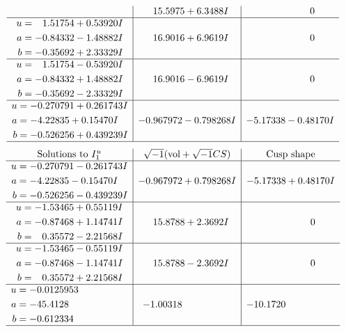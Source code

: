 \documentclass[1p]{elsarticle_modified}
\theoremstyle{definition}
\newcommand{\I}{\sqrt{-1}}
\begin{document}
$$\begin{array}{c|c|c}
 & \phantom{-}15.5975 + 6.3488 I & \phantom{-0.000000 } 0 \\ \hline\begin{aligned}
u &= \phantom{-}1.51754 + 0.53920 I \\
a &= -0.84332 - 1.48882 I \\
b &= -0.35692 + 2.33329 I\end{aligned}
 & \phantom{-}16.9016 + 6.9619 I & \phantom{-0.000000 } 0 \\ \hline\begin{aligned}
u &= \phantom{-}1.51754 - 0.53920 I \\
a &= -0.84332 + 1.48882 I \\
b &= -0.35692 - 2.33329 I\end{aligned}
 & \phantom{-}16.9016 - 6.9619 I & \phantom{-0.000000 } 0 \\ \hline\begin{aligned}
u &= -0.270791 + 0.261743 I \\
a &= -4.22835 + 0.15470 I \\
b &= -0.526256 + 0.439239 I\end{aligned}
 & -0.967972 - 0.798268 I & -5.17338 - 0.48170 I\\
 \hline 
 \end{array}$$\newpage$$\begin{array}{c|c|c}  
\text{Solutions to }I^u_{1}& \I (\text{vol} + \sqrt{-1}CS) & \text{Cusp shape}\\
 \hline 
\begin{aligned}
u &= -0.270791 - 0.261743 I \\
a &= -4.22835 - 0.15470 I \\
b &= -0.526256 - 0.439239 I\end{aligned}
 & -0.967972 + 0.798268 I & -5.17338 + 0.48170 I \\ \hline\begin{aligned}
u &= -1.53465 + 0.55119 I \\
a &= -0.87468 + 1.14741 I \\
b &= \phantom{-}0.35572 - 2.21568 I\end{aligned}
 & \phantom{-}15.8788 + 2.3692 I & \phantom{-0.000000 } 0 \\ \hline\begin{aligned}
u &= -1.53465 - 0.55119 I \\
a &= -0.87468 - 1.14741 I \\
b &= \phantom{-}0.35572 + 2.21568 I\end{aligned}
 & \phantom{-}15.8788 - 2.3692 I & \phantom{-0.000000 } 0 \\ \hline\begin{aligned}
u &= -0.0125953\phantom{ +0.000000I} \\
a &= -45.4128\phantom{ +0.000000I} \\
b &= -0.612334\phantom{ +0.000000I}\end{aligned}
 & -1.00318\phantom{ +0.000000I} & -10.1720\phantom{ +0.000000I}\\
 \hline 
 \end{array}$$\newpage\newpage\renewcommand{\arraystretch}{1}
\end{document}
